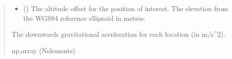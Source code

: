 \documentclass[letterpaper,10pt,english]{sphinxmanual}
\begin{document}
\begin{fulllineitems}
\begin{fulllineitems}
\begin{quote}
\begin{description}
\begin{itemize}
\item {} 
\sphinxAtStartPar
{} () \textendash{} The altitude offset for the position of interest.
The elevation from the WGS\sphinxhyphen{}84 reference ellipsoid in metres.

\end{itemize}

\sphinxAtStartPar
The downwards gravitational acceleration for each location
(in m/s\textasciicircum{}2).

\sphinxAtStartPar
np.array (N\sphinxhyphen{}elements)

\end{description}\end{quote}

\end{fulllineitems}


\end{fulllineitems}

\end{document}
